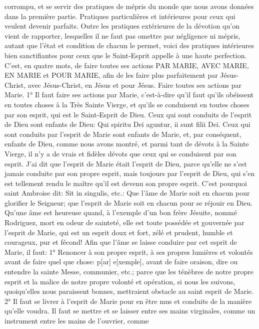 corrompu, et se servir des pratiques de mépris du monde que nous avons données dans la première partie.
Pratiques particulières et intérieures
pour ceux qui veulent devenir parfaits.
 Outre les pratiques extérieures de la dévotion qu'on vient de rapporter, lesquelles il ne faut pas omettre par
négligence ni mépris, autant que l'état et condition de chacun le permet, voici des pratiques intérieures bien
sanctifiantes pour ceux que le Saint-Esprit appelle à une haute perfection.
C'est, en quatre mots, de faire toutes ses actions PAR MARIE, AVEC MARIE, EN MARIE et POUR MARIE, afin de
les faire plus parfaitement par Jésus-Christ, avec Jésus-Christ, en Jésus et pour Jésus.
Faire toutes ses actions par Marie.
 1° Il faut faire ses actions par Marie, c'est-à-dire qu'il faut qu'ils obéissent en toutes choses à la Très Sainte
Vierge, et qu'ils se conduisent en toutes choses par son esprit, qui est le Saint-Esprit de Dieu. Ceux qui sont
conduits de l'esprit de Dieu sont enfants de Dieu: Qui spiritu Dei aguntur, ii sunt filii Dei. Ceux qui sont conduits par
l'esprit de Marie sont enfants de Marie, et, par conséquent, enfants de Dieu, comme nous avons montré, et parmi
tant de dévots à la Sainte Vierge, il n'y a de vrais et fidèles dévots que ceux qui se conduisent par son esprit. J'ai
dit que l'esprit de Marie était l'esprit de Dieu, parce qu'elle ne s'est jamais conduite par son propre esprit, mais
toujours par l'esprit de Dieu, qui s'en est tellement rendu le maître qu'il est devenu son propre esprit. C'est
pourquoi saint Ambroise dit: Sit in singulis, etc.: Que l'âme de Marie soit en chacun pour glorifier le Seigneur; que
l'esprit de Marie soit en chacun pour se réjouir en Dieu. Qu'une âme est heureuse quand, à l'exemple d'un bon
frère Jésuite, nommé Rodriguez, mort en odeur de sainteté, elle est toute possédée et gouvernée par l'esprit de
Marie, qui est un esprit doux et fort, zélé et prudent, humble et courageux, pur et fécond!
 Afin que l'âme se laisse conduire par cet esprit de Marie, il faut: 1° Renoncer à son propre esprit, à ses
propres lumières et volontés avant de faire quel que chose: p[ar] e[xemple], avant de faire oraison, dire ou
entendre la sainte Messe, communier, etc.; parce que les ténèbres de notre propre esprit et la malice de notre
propre volonté et opération, si nous les suivons, quoiqu'elles nous paraissent bonnes, mettraient obstacle au saint
esprit de Marie. 2° Il faut se livrer à l'esprit de Marie pour en être mus et conduits de la manière qu'elle voudra. Il
faut se mettre et se laisser entre ses mains virginales, comme un instrument entre les mains de l'ouvrier, comme

